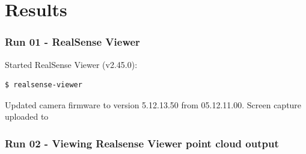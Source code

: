 \chapter{Results} %
\label{Appendix-results} %



\subsection{Run 01 - RealSense Viewer}

\label{app_res:01}

Started RealSense Viewer (v2.45.0): 
\begin{verbatim}
$ realsense-viewer    
\end{verbatim}
Updated camera firmware to version 5.12.13.50 from 05.12.11.00.
Screen capture uploaded to 

\subsection{Run 02 - Viewing Realsense Viewer point cloud output}
\label{app_res:01}

